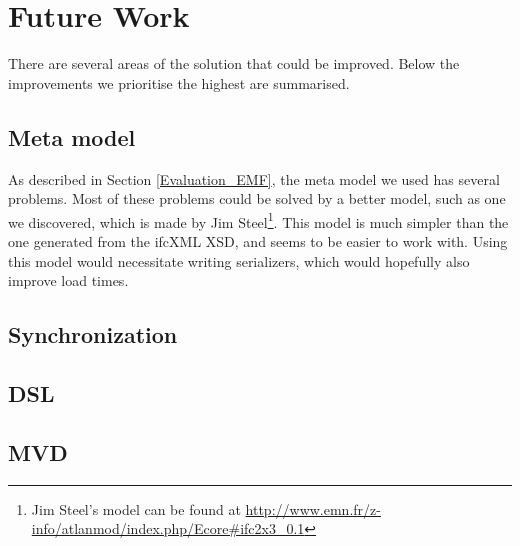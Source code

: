\section{Future Work}
\label{sec:future_work}
There are several areas of the solution that could be improved. Below the improvements we prioritise the highest are summarised. 
\subsection{Meta model}
As described in Section \ref{Evaluation_EMF}, the meta model we used has several problems. Most of these problems could be solved by a better model, such as one we discovered, which is made by Jim Steel\footnote{Jim Steel's model can be found at \url{http://www.emn.fr/z-info/atlanmod/index.php/Ecore#ifc2x3_0.1}}. This model is much simpler than the one generated from the ifcXML XSD, and seems to be easier to work with. Using this model would necessitate writing serializers, which would hopefully also improve load times.
\subsection{Synchronization}
\subsection{DSL}
\subsection{MVD}